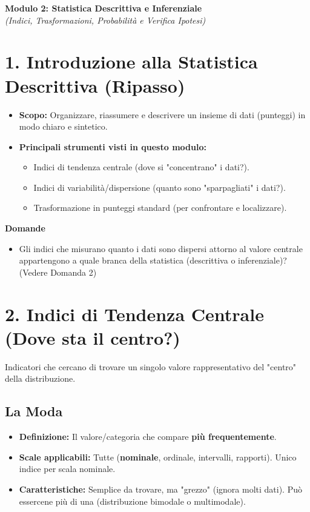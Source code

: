 \documentclass[12pt, a4paper]{article}
\newenvironment{reflectionbox}{%
    \medskip %
    \begin{framed}\par\noindent
    \textbf{\color{boxtitlecolor}Domande} \par
    \begin{itemize}[leftmargin=*, label=$\blacktriangleright$]
}{%
    \end{itemize}\par
    \end{framed}
    \medskip %
}
\begin{document}
\begin{center}
    \Large\textbf{Modulo 2: Statistica Descrittiva e Inferenziale} \\
    \vspace{0.5cm}
    \large\textit{(Indici, Trasformazioni, Probabilità e Verifica Ipotesi)}
\end{center}

\section*{1. Introduzione alla Statistica Descrittiva (Ripasso)}
\begin{itemize}
    \item \textbf{Scopo:} Organizzare, riassumere e descrivere un insieme di dati (punteggi) in modo chiaro e sintetico.
    \item \textbf{Principali strumenti visti in questo modulo:}
        \begin{itemize}
            \item Indici di tendenza centrale (dove si "concentrano" i dati?).
            \item Indici di variabilità/dispersione (quanto sono "sparpagliati" i dati?).
            \item Trasformazione in punteggi standard (per confrontare e localizzare).
        \end{itemize}
\end{itemize}

\begin{reflectionbox}
    \item Gli indici che misurano quanto i dati sono dispersi attorno al valore centrale appartengono a quale branca della statistica (descrittiva o inferenziale)? (Vedere Domanda 2)
\end{reflectionbox}

\section*{2. Indici di Tendenza Centrale (Dove sta il centro?)}
Indicatori che cercano di trovare un singolo valore rappresentativo del "centro" della distribuzione.

\subsection*{La Moda}
\begin{itemize}
    \item \textbf{Definizione:} Il valore/categoria che compare \textbf{più frequentemente}.
    \item \textbf{Scale applicabili:} Tutte (\textbf{nominale}, ordinale, intervalli, rapporti). Unico indice per scala nominale.
    \item \textbf{Caratteristiche:} Semplice da trovare, ma "grezzo" (ignora molti dati). Può essercene più di una (distribuzione bimodale o multimodale).
\end{itemize}
\end{document}
